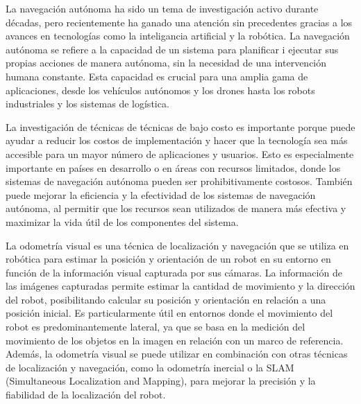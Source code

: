 \documentclass[
11pt, %
codirector, %
]{charter}
\begin{document}




La navegación autónoma ha sido un tema de investigación activo durante décadas, pero recientemente ha ganado una atención sin precedentes gracias a los avances en tecnologías como la inteligancia artificial y la robótica. La navegación autónoma se refiere a la capacidad de un sistema para planificar i ejecutar sus propias acciones de manera autónoma, sin la necesidad de una intervención humana constante. Esta capacidad es crucial para una amplia gama de aplicaciones, desde los vehículos autónomos y los drones hasta los robots industriales y los sistemas de logística.

La investigación de técnicas de técnicas de bajo costo es importante porque puede ayudar a reducir los costos de implementación y hacer que la tecnología sea más accesible para un mayor número de aplicaciones y usuarios. Esto es especialmente importante en países en desarrollo o en áreas con recursos limitados, donde los sistemas de navegación autónoma pueden ser prohibitivamente costosos. También puede mejorar la eficiencia y la efectividad de los sistemas de navegación autónoma, al permitir que los recursos sean utilizados de manera más efectiva y maximizar la vida útil de los componentes del sistema.

La odometría visual es una técnica de localización y navegación que se utiliza en robótica para estimar la posición y orientación de un robot en su entorno en función de la información visual capturada por sus cámaras. La información de las imágenes capturadas permite estimar la cantidad de movimiento y la dirección del robot, posibilitando calcular su posición y orientación en relación a una posición inicial. Es particularmente útil en entornos donde el movimiento del robot es predominantemente lateral, ya que se basa en la medición del movimiento de los objetos en la imagen en relación con un marco de referencia. Además, la odometría visual se puede utilizar en combinación con otras técnicas de localización y navegación, como la odometría inercial o la SLAM (Simultaneous Localization and Mapping), para mejorar la precisión y la fiabilidad de la localización del robot.
\end{document}
